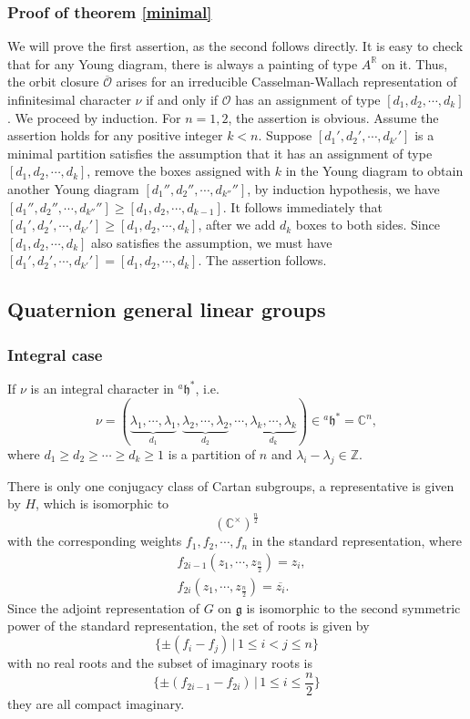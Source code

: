 \documentclass[12pt, a4paper]{amsart}
\numberwithin{equation}{section}
\newcommand{\BC}{{\mathbb {C}}}
\newcommand{\BR}{{\mathbb {R}}}
\newcommand{\BZ}{{\mathbb {Z}}}
\newcommand{\CO}{{\mathcal {O}}}
\newcommand{\fg}{\mathfrak{g}}
\newcommand{\fh}{\mathfrak{h}}
\newcommand{\set}[2]{\{#1\,|\,#2\}}
\renewcommand{\bar}{\overline}
\begin{document}
\subsubsection{Proof of theorem \ref{minimal}}


We will prove the first assertion, as the second follows directly. It is easy to check that for any Young diagram, there is always a painting of type $A^{\BR}$ on it. Thus, the orbit closure $\bar{\CO}$  arises for an irreducible Casselman-Wallach representation of infinitesimal character $\nu$ if and only if $\CO$ has an assignment of type $[d_1, d_2, \cdots , d_k]$. We proceed by induction. For $n = 1,2$, the assertion is obvious. Assume the assertion holds for any positive integer $k < n$. Suppose $[d_1', d_2', \cdots , d_{k'}']$ is a minimal partition satisfies the assumption that it has an assignment of type $[d_1, d_2, \cdots , d_k]$, remove the boxes assigned with $k$ in the Young diagram to obtain another Young diagram $[d_1'', d_2'', \cdots , d_{k''}'']$, by induction hypothesis, we have $[d_1'', d_2'', \cdots , d_{k''}''] \geq [d_1, d_2, \cdots , d_{k-1}]$. It follows immediately that $[d_1', d_2', \cdots , d_{k'}'] \geq [d_1, d_2, \cdots , d_k]$, after we add $d_k$ boxes to both sides. Since $[d_1, d_2, \cdots , d_k]$ also satisfies the assumption, we must have $[d_1', d_2', \cdots , d_{k'}'] = [d_1, d_2, \cdots , d_k]$. The assertion follows.






\subsection{Quaternion general linear groups}
\subsubsection{Integral case}
If $\nu$ is an integral character in $^{a}\fh^*$, i.e. 
$$\nu =  (\underbrace{\lambda_1, \cdots, \lambda_1}_{d_1}, \underbrace{\lambda_2, \cdots, \lambda_2}_{d_2}, \cdots, \underbrace{\lambda_k, \cdots, \lambda_k}_{d_k} ) \in {^{a}\fh^*} = \BC^n,$$ 
where $d_1 \geq d_2 \geq \cdots \geq d_k \geq 1$ is a partition of $n$ and $\lambda_i - \lambda_j \in \BZ$. 

There is only one conjugacy class of Cartan subgroups, a representative is given by $H$, which is isomorphic to
$$(\BC^\times)^{\frac{n}{2}}$$
with the corresponding weights $f_1, f_2, \cdots ,f_n$ in the standard representation, where
\begin{align}
    &f_{2i-1}(z_1,\cdots,z_{\frac{n}{2}}) = z_i,\\
    &f_{2i}(z_1,\cdots,z_{\frac{n}{2}}) = \bar{z_i}.
\end{align}
Since the adjoint representation of $G$ on $\fg$ is isomorphic to the second symmetric power of the standard representation, the set of roots is given by
$$\set{\pm(f_i - f_j)}{1\leq i < j \leq n}$$
with no real roots and the subset of imaginary roots is
$$\set{\pm(f_{2i-1}-f_{2i})}{1 \leq i \leq \frac{n}{2}}$$
they are all compact imaginary. 
\end{document}
